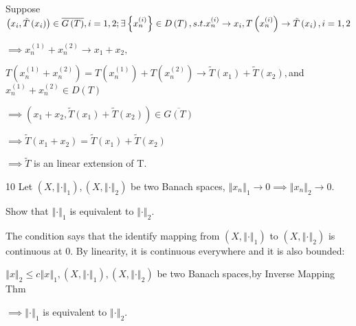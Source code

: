 \documentclass{article}
\begin{document}
\begin{CJK}{GBK}{song}
Suppose $\left( x_{i},\tilde{T}\left( x_{i}\right) \right) \in \overline{%
G\left( T\right) },i=1,2;\exists \left\{ x_{n}^{\left( i\right) }\right\}
\in D\left( T\right) ,s.t.x_{n}^{\left( i\right) }\rightarrow x_{i},T\left(
x_{n}^{\left( i\right) }\right) \rightarrow \tilde{T}\left( x_{i}\right)
,i=1,2$

$\implies x_{n}^{\left( 1\right) }+x_{n}^{\left( 2\right) }\rightarrow
x_{1}+x_{2},$

$T\left( x_{n}^{\left( 1\right) }+x_{n}^{\left( 2\right) }\right) =T\left(
x_{n}^{\left( 1\right) }\right) +T\left( x_{n}^{\left( 2\right) }\right)
\rightarrow \tilde{T}\left( x_{1}\right) +\tilde{T}\left( x_{2}\right) ,$and 
$x_{n}^{\left( 1\right) }+x_{n}^{\left( 2\right) }\in D\left( T\right) $

$\implies \left( x_{1}+x_{2},\tilde{T}\left( x_{1}\right) +\tilde{T}\left(
x_{2}\right) \right) \in \overline{G\left( T\right) }$

$\implies \tilde{T}\left( x_{1}+x_{2}\right) =\tilde{T}\left( x_{1}\right) +%
\tilde{T}\left( x_{2}\right) $

$\implies \tilde{T}$ is an linear extension of T.

10 Let $\left( X,\left\Vert \cdot \right\Vert _{1}\right) ,\left(
X,\left\Vert \cdot \right\Vert _{2}\right) $ be two Banach spaces, $%
\left\Vert x_{n}\right\Vert _{1}\rightarrow 0\implies \left\Vert
x_{n}\right\Vert _{2}\rightarrow 0.$

Show that $\left\Vert \cdot \right\Vert _{1}$ is equivalent to $\left\Vert
\cdot \right\Vert _{2}.$

The condition says that the identify mapping from $\left( X,\left\Vert \cdot
\right\Vert _{1}\right) $ to $\left( X,\left\Vert \cdot \right\Vert
_{2}\right) $ is continuous at 0. By linearity, it is continuous everywhere
and it is also bounded:

$\left\Vert x\right\Vert _{2}\leq c\left\Vert x\right\Vert _{1},\left(
X,\left\Vert \cdot \right\Vert _{1}\right) ,\left( X,\left\Vert \cdot
\right\Vert _{2}\right) $ be two Banach spaces,by Inverse Mapping Thm

$\implies \left\Vert \cdot \right\Vert _{1}$ is equivalent to $\left\Vert
\cdot \right\Vert _{2}.$
\end{CJK}
\end{document}
